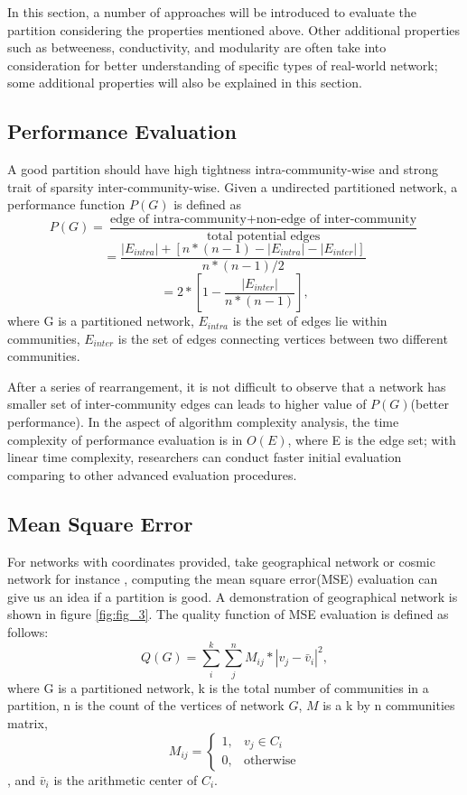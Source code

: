 \documentclass[12pt]{article}
\begin{document}
In this section, a number of approaches will be introduced to evaluate the partition considering the properties mentioned above. Other additional properties such as betweeness, conductivity, and modularity are often take into consideration for better understanding of specific types of real-world network\cite{7,8}; some additional properties will also be explained in this section.

\subsection{Performance Evaluation}
A good partition should have high tightness intra-community-wise and strong trait of sparsity inter-community-wise. Given a undirected partitioned network, a performance function $P(G)$ is defined as
$$P(G) = \frac{\text{edge of intra-community} + \text{non-edge of inter-community}}{\text{total potential edges}}$$
$$=\frac{|E_{intra}| + [n*(n-1) - |E_{intra}| - |E_{inter}|]}{n*(n-1)/2}$$
$$=2*\left[ 1 - \frac{ |E_{inter}| } { n*\left( n-1 \right) }  \right],$$
where G is a partitioned network, $E_{intra}$ is the set of edges lie within communities, $E_{inter}$ is the set of edges connecting vertices between two different communities. 

\bigbreak

After a series of rearrangement, it is not difficult to observe that a network has smaller set of inter-community edges can leads to higher value of $P(G)$(better performance)\cite{7}. In the aspect of algorithm complexity analysis, the time complexity of performance evaluation is in $O(E)$, where E is the edge set; with linear time complexity, researchers can conduct faster initial evaluation comparing to other advanced evaluation procedures.

\subsection{Mean Square Error}
For networks with coordinates provided, take geographical network or cosmic network for instance \cite{9,10}, computing the mean square error(MSE) evaluation can give us an idea if a partition is good. A demonstration of geographical network is shown in figure \ref{fig:fig_3}. The quality function of MSE evaluation is defined as follows:
    $$Q(G) = \sum_{i}^{k}\sum_{j}^{n} M_{i j} * |v_{j} - \bar{v}_{i}|^{2},$$
where G is a partitioned network, k is the total number of communities in a partition, n is the count of the vertices of network $G$, $M$ is a k by n communities matrix, \[
  M_{ij} = 
  \begin{cases}
    1, &  v_{j} \in C_i\\
    0, & \text{otherwise}
  \end{cases}
\]
, and $\bar{v}_{i}$ is the arithmetic center of $C_i$. 
\end{document}
